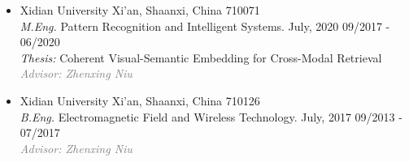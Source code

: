 \documentclass[10pt,margin,line,pifont,palatino,courier]{res}
\newenvironment{list1}{
  \begin{list}{\ding{113}}{%
      \setlength{\itemsep}{0in}
      \setlength{\parsep}{0in} \setlength{\parskip}{0in}
      \setlength{\topsep}{0in} \setlength{\partopsep}{0in}
      \setlength{\leftmargin}{0.17in}}}{\end{list}}
\newenvironment{list2}{
  \begin{list}{$\bullet$}{%
      \setlength{\itemsep}{0in}
      \setlength{\parsep}{0in} \setlength{\parskip}{0in}
      \setlength{\topsep}{0in} \setlength{\partopsep}{0in}
      \setlength{\leftmargin}{0.2in}}}{\end{list}}
\begin{document}
\begin{resume}
\begin{itemize}[leftmargin=*]
\item Xidian University \hfill Xi'an, Shaanxi, China 710071\\
    \textit{M.Eng.} Pattern Recognition and Intelligent Systems. July, 2020 \hfill 09/2017 - 06/2020\\
    \textit{Thesis:} Coherent Visual-Semantic Embedding for Cross-Modal Retrieval\\
    \textcolor{gray}{\small\it Advisor: Zhenxing Niu}
\item Xidian University \hfill Xi'an, Shaanxi, China 710126\\
    \textit{B.Eng.} Electromagnetic Field and Wireless Technology. July, 2017 \hfill 09/2013 - 07/2017\\
    \textcolor{gray}{\small\it Advisor: Zhenxing Niu}
\end{itemize}

%
%
%

%


\end{resume}
\end{document}
